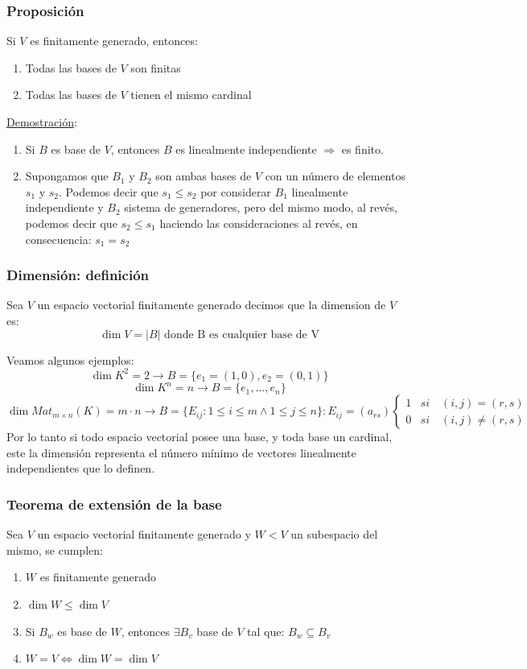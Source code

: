 \documentclass[10pt,a4paper,openright]{book}
\begin{document}
\subsubsection*{Proposición}
Si $V$ es finitamente generado, entonces:
\begin{enumerate}
\item Todas las bases de $V$ son finitas
\item Todas las bases de $V$ tienen el mismo cardinal
\end{enumerate}

\underline{Demostración}:
\begin{enumerate}
\item Si $B$ es base de $V$, entonces $B$ es linealmente independiente $\Rightarrow$ es finito.

\item Supongamos que $B_1$ y $B_2$ son ambas bases de $V$ con un número de elementos $s_1$ y $s_2$. Podemos decir que $s_1\leq s_2$ por considerar $B_1$ linealmente independiente y $B_2$ sistema de generadores, pero del mismo modo, al revés, podemos decir que $s_2\leq s_1$ haciendo las consideraciones al revés, en consecuencia: $s_1=s_2$
\end{enumerate}

\subsubsection*{Dimensión: definición}
Sea $V$ un espacio vectorial finitamente generado decimos que la dimension de $V$ es:
$$\dim V=|B| \mbox{ donde B es cualquier base de V}$$

Veamos algunos ejemplos:
$$\dim K^2=2\rightarrow B=\{e_1=(1,0), e_2=(0,1)\}$$
$$\dim K^n=n\rightarrow B=\{e_1, ..., e_n\}$$
$$\dim Mat_{m\times n}(K)=m\cdot n\rightarrow B=\{E_{ij}: 1\leq i\leq m \wedge 1\leq j\leq n\}: E_{ij}=(a_{rs})\begin{cases}
1 & si \quad (i,j)=(r,s) \\
0 & si \quad(i,j)\neq (r,s)
\end{cases}$$
Por lo tanto si todo espacio vectorial posee una base, y toda base un cardinal, este la dimensión representa el número mínimo de vectores linealmente independientes que lo definen.

\subsubsection*{Teorema de extensión de la base}
Sea $V$ un espacio vectorial finitamente generado y $W<V$ un subespacio del mismo, se cumplen:
\begin{enumerate}
\item $W$ es finitamente generado
\item $\dim W\leq \dim V$
\item Si $B_w$ es base de $W$, entonces $\exists B_v$ base de $V$ tal que: $B_w\subseteq B_v$
\item $W=V\Leftrightarrow \dim W=\dim V$
\end{enumerate}
\end{document}
